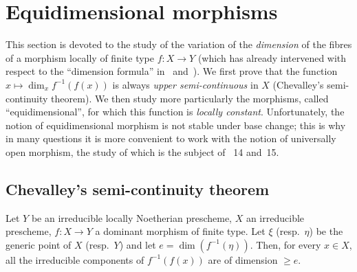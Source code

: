 \section{Equidimensional morphisms}
\label{section:IV.13}


This section is devoted to the study of the variation of the \emph{dimension} of the fibres of a morphism locally of finite type $f:X\to Y$ (which has already intervened with respect to the ``dimension formula'' in~ and~).
We first prove  that the function $x\mapsto\dim_x f^{-1}(f(x))$ is always \emph{upper semi-continuous} in $X$ (Chevalley's semi-continuity theorem).
We then study more particularly the morphisms, called ``equidimensional'', for which this function is \emph{locally constant}.
Unfortunately, the notion of equidimensional morphism is not stable under base change; this is why in many questions it is more convenient to work with the notion of universally open morphism, the study of which is the subject of \textsection\textsection~14 and~15.

\subsection{Chevalley's semi-continuity theorem}
\label{subsection:IV.13.1}

\begin{lemma}[13.1.1]
\label{IV.13.1.1}
Let $Y$ be an irreducible locally Noetherian prescheme, $X$ an irreducible prescheme, $f:X\to Y$ a dominant morphism of finite type.
Let $\xi$ (resp.\ $\eta$) be the generic point of $X$ (resp.\ $Y$) and let $e=\dim(f^{-1}(\eta))$.
Then, for every $x\in X$, all the irreducible components of $f^{-1}(f(x))$ are of dimension $\geq e$.
\end{lemma}

